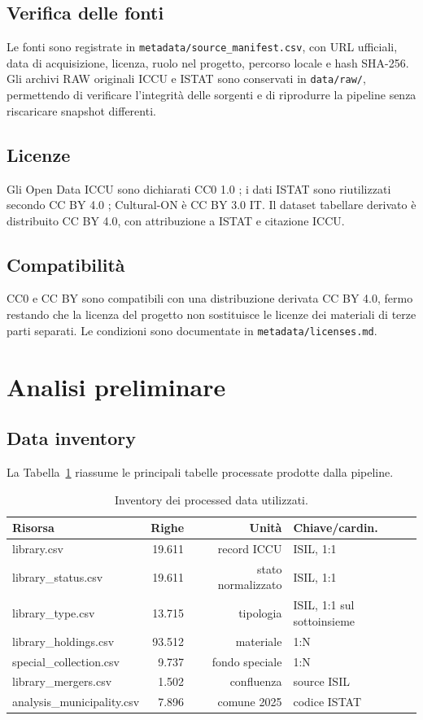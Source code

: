 \documentclass[11pt,a4paper]{article}
\begin{document}
\subsection{Verifica delle fonti}
Le fonti sono registrate in \texttt{metadata/source\_manifest.csv}, con URL ufficiali, data di acquisizione, licenza, ruolo nel progetto, percorso locale e hash SHA-256. Gli archivi RAW originali ICCU e ISTAT sono conservati in \texttt{data/raw/}, permettendo di verificare l'integrità delle sorgenti e di riprodurre la pipeline senza riscaricare snapshot differenti.

\subsection{Licenze}
Gli Open Data ICCU sono dichiarati CC0 1.0 \cite{iccu_license}; i dati ISTAT sono riutilizzati secondo CC BY 4.0 \cite{istat_open}; Cultural-ON è CC BY 3.0 IT. Il dataset tabellare derivato è distribuito CC BY 4.0, con attribuzione a ISTAT e citazione ICCU.

\subsection{Compatibilità}
CC0 e CC BY sono compatibili con una distribuzione derivata CC BY 4.0, fermo restando che la licenza del progetto non sostituisce le licenze dei materiali di terze parti separati. Le condizioni sono documentate in \texttt{metadata/licenses.md}.

\section{Analisi preliminare}
\subsection{Data inventory}
La Tabella~\ref{tab:inventory} riassume le principali tabelle processate prodotte dalla pipeline.
\begin{table}[H]
\centering
\small
\begin{tabular}{lrrl}
\toprule
Risorsa & Righe & Unità & Chiave/cardin. \\
\midrule
library.csv & 19.611 & record ICCU & ISIL, 1:1 \\
library\_status.csv & 19.611 & stato normalizzato & ISIL, 1:1 \\
library\_type.csv & 13.715 & tipologia & ISIL, 1:1 sul sottoinsieme \\
library\_holdings.csv & 93.512 & materiale & 1:N \\
special\_collection.csv & 9.737 & fondo speciale & 1:N \\
library\_mergers.csv & 1.502 & confluenza & source ISIL \\
analysis\_municipality.csv & 7.896 & comune 2025 & codice ISTAT \\
\bottomrule
\end{tabular}
\caption{Inventory dei processed data utilizzati.}
\label{tab:inventory}
\end{table}
\end{document}
